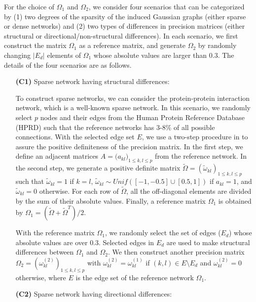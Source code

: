 \documentclass[useAMS,usenatbib,referee]{bio}
\begin{document}
{{For the choice of $\Omega_1$ and $\Omega_2$,  we consider four scenarios that can be categorized by (1) two degrees of the sparsity of the induced Gaussian graphs (either sparse or dense networks) and (2) two types of differences in precision matrices (either structural or directional/non-structural differences).
In each scenario, we first construct the matrix $\Omega_1$ as a reference matrix, and generate $\Omega_2$ by randomly changing $|E_d|$ elements of $\Omega_1$ whose absolute values are larger than $0.3$.
The details of the four scenarios are as follows.


\begin{itemize}
\item[{\bf (C1)}] Sparse network having structural differences:

To construct sparse networks, we can consider the protein-protein  interaction network, which is a well-known sparse network.
In this scenario, we randomly select $p$ nodes and their edges from the Human Protein Reference Database (HPRD) \citep{Prasad:2009}  such that the reference networks has $3$-$8\%$ of all possible connections.
With the selected edge set $E$, we use a two-step procedure in \citet{Peng:2009} to assure the positive definiteness of the precision matrix.
In the first step, we define an adjacent matrices $A=\big(a_{kl} \big)_{1 \le k,l \le p}$ from the reference network.
In the second step, we generate a positive definite matrix 
$\tilde{\Omega}= (\tilde{\omega}_{kl})_{1 \le k,l \le p}$ 
such that $\tilde{\omega}_{kl} = 1$ if $k = l$, $\tilde{\omega}_{kl} \sim Unif([-1,-0.5] \cup [0.5, 1])$
if $a_{kl} = 1$, and $\tilde{\omega}_{kl} = 0$ otherwise.
For each row of $\tilde{\Omega}$, all the off-diagonal elements are divided by the sum of their absolute values. Finally, a reference matrix $\Omega_1 $ is obtained by
$\Omega_1 = (\tilde{\Omega} + \tilde{\Omega}^T)/2$.  

With the reference matrix $\Omega_1$, 
we randomly select the set of edges ($E_d$) whose absolute values
are over $0.3$. Selected edges in $E_d$ are used to make structural differences between $\Omega_1$ and $\Omega_2$. 
We then construct another precision matrix 
$\Omega_2 = (\omega^{(2)}_{kl})_{1 \le k,l \le p}$ 
with $\omega^{(2)}_{kl} = \omega^{(1)}_{kl}$ if $(k,l) \in E \setminus E_d$ and $\omega^{(2)}_{kl} = 0$ otherwise, where $E$ is the edge set of the reference network $\Omega_1$. 


\item[{\bf (C2)}] Sparse network having directional differences:


\end{itemize}}}
\end{document}

